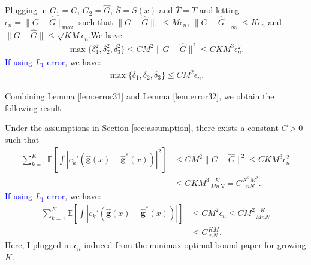 \documentclass[preprint,11pt]{article}
\newcommand{\mbb}{\mathbb}
\numberwithin{equation}{section}
\begin{document}
\begin{lemma}\label{lem:error32}
Plugging in $G_1=G$, $G_2=\widehat{G}$, $\bar{S}=S(x)$ and $\bar{T}=T$ and letting $\epsilon_n=\|G-\widehat{G}\|_{\max}$ such that $\|G-\widehat{G}\|_1\le M\epsilon_n$, $\|G-\widehat{G}\|_{\infty}\le K\epsilon_n$ and $\|G-\widehat{G}\|\le \sqrt{KM}\epsilon_n$.We have:
\begin{align*}
    \max\{\delta_1^2,\delta_2^2,\delta_3^2\}\le CM^2\|G-\widehat{G}\|^2\le CKM^3\epsilon_n^2.
\end{align*}
\textcolor{blue}{If using $L_1$ error}, we have:
\begin{align*}
    \max\{\delta_1,\delta_2,\delta_3\}\le CM^2\epsilon_n.
\end{align*}
\end{lemma}

Combining Lemma \ref{lem:error31} and Lemma \ref{lem:error32}, we obtain the following result.
\begin{lemma}\label{lem:error33}
Under the assumptions in Section \ref{sec:assumption}, there exists a constant $C>0$ such that
\begin{align*}
    \sum_{k=1}^K\mbb{E}\left[\int |e_k'(\widehat{\boldsymbol g}(x)-\widehat{\boldsymbol g}^*(x))|^2\right]&\le CM^2\|G-\widehat{G}\|^2\le CKM^3\epsilon_n^2\\
    &\le CKM^3\frac{K}{MnN}=C\frac{K^2M^2}{nN}.
\end{align*}
\textcolor{blue}{If using $L_1$ error}, we have:
\begin{align*}
    \sum_{k=1}^K\mbb{E}\left[\int |e_k'(\widehat{\boldsymbol g}(x)-\widehat{\boldsymbol g}^*(x))|\right]&\le CM^2\epsilon_n\le CM^2\frac{K}{MnN}\\
    &\le C\frac{KM}{nN}.
\end{align*}
Here, I plugged in $\epsilon_n$ induced from the minimax optimal bound paper for growing $K$.
\end{lemma}
\fi
\end{document}
